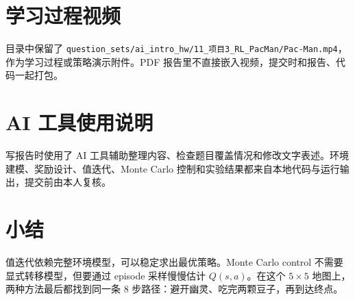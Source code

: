 \documentclass[a4paper,11pt]{article}
\begin{document}
\section{学习过程视频}

目录中保留了 \texttt{question\_sets/ai\_intro\_hw/11\_项目3\_RL\_PacMan/Pac-Man.mp4}，作为学习过程或策略演示附件。PDF 报告里不直接嵌入视频，提交时和报告、代码一起打包。

\section{AI 工具使用说明}

写报告时使用了 AI 工具辅助整理内容、检查题目覆盖情况和修改文字表述。环境建模、奖励设计、值迭代、Monte Carlo 控制和实验结果都来自本地代码与运行输出，提交前由本人复核。

\section{小结}

值迭代依赖完整环境模型，可以稳定求出最优策略。Monte Carlo control 不需要显式转移模型，但要通过 episode 采样慢慢估计 \(Q(s,a)\)。在这个 \(5\times5\) 地图上，两种方法最后都找到同一条 8 步路径：避开幽灵、吃完两颗豆子，再到达终点。
\end{document}
